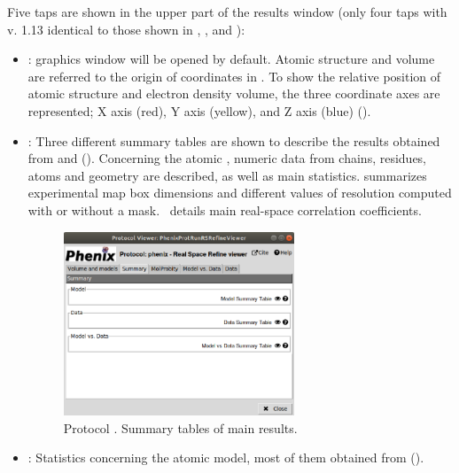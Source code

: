 \begin{itemize}
Five taps are shown in the upper part of the results window (only four taps with \phenix v. 1.13 identical to those shown in , ,  and ):
   \begin{itemize}
     \item {}: \chimera graphics window will be opened by default. Atomic structure and volume are referred to the origin of coordinates in \chimera. To show the relative position of atomic structure and electron density volume, the three coordinate axes are represented; X axis (red), Y axis (yellow), and Z axis (blue) ().
     \item {}: Three different summary tables are shown to describe the results obtained from  and  (). Concerning the atomic , numeric data from chains, residues, atoms and geometry are described, as well as main \molprobity statistics.  summarizes experimental map box dimensions and different values of resolution computed with or without a mask. \ details main real-space correlation coefficients.
        \begin{figure}[H]
         \centering 
         \captionsetup{width=.7\linewidth} 
         \includegraphics[width=0.65\textwidth]{Images_appendix/Fig150_0.pdf}
         \caption{Protocol . Summary tables of main\phenix {} results.}
         \label{fig:app_protocol_real_space_refine_2_1}
        \end{figure}
     \item {}: Statistics concerning the atomic model, most of them obtained from \molprobity ().

\end{itemize}
\end{itemize}
